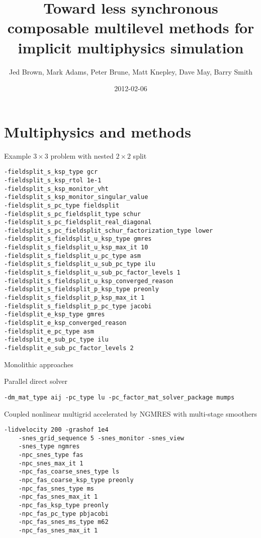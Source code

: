 \documentclass{beamer}
\title{Toward less synchronous composable multilevel methods for implicit multiphysics simulation}
\author{Jed Brown\inst{1}, Mark Adams\inst{2}, Peter Brune\inst{1}, Matt Knepley\inst{3}, Dave May\inst{4}, Barry Smith\inst{1}}
\institute
{
  \inst{1}{Mathematics and Computer Science Division, Argonne National Laboratory} \\
  \inst{2}{Columbia University} \\
  \inst{3}{Computation Institute, University of Chicago} \\
  \inst{4}{ETH Z\"urich}
}
\date{2012-02-06}
\begin{document}
\lstset{language=C}
\normalem

\begin{frame}
  \titlepage
\end{frame}

\section{Multiphysics and methods}





\begin{frame}[fragile]{Example $3\times 3$ problem with nested $2\times 2$ split}
\begin{Verbatim}[formatcom=\footnotesize]
-fieldsplit_s_ksp_type gcr
-fieldsplit_s_ksp_rtol 1e-1
-fieldsplit_s_ksp_monitor_vht
-fieldsplit_s_ksp_monitor_singular_value
-fieldsplit_s_pc_type fieldsplit
-fieldsplit_s_pc_fieldsplit_type schur
-fieldsplit_s_pc_fieldsplit_real_diagonal
-fieldsplit_s_pc_fieldsplit_schur_factorization_type lower
-fieldsplit_s_fieldsplit_u_ksp_type gmres
-fieldsplit_s_fieldsplit_u_ksp_max_it 10
-fieldsplit_s_fieldsplit_u_pc_type asm
-fieldsplit_s_fieldsplit_u_sub_pc_type ilu
-fieldsplit_s_fieldsplit_u_sub_pc_factor_levels 1
-fieldsplit_s_fieldsplit_u_ksp_converged_reason
-fieldsplit_s_fieldsplit_p_ksp_type preonly
-fieldsplit_s_fieldsplit_p_ksp_max_it 1
-fieldsplit_s_fieldsplit_p_pc_type jacobi
-fieldsplit_e_ksp_type gmres
-fieldsplit_e_ksp_converged_reason
-fieldsplit_e_pc_type asm
-fieldsplit_e_sub_pc_type ilu
-fieldsplit_e_sub_pc_factor_levels 2
\end{Verbatim}
\end{frame}

\begin{frame}[fragile]{Monolithic approaches}
  \begin{block}{Parallel direct solver}
    \begin{Verbatim}[formatcom=\footnotesize]
      -dm_mat_type aij -pc_type lu -pc_factor_mat_solver_package mumps
    \end{Verbatim}
  \end{block}
  \begin{block}{Coupled nonlinear multigrid accelerated by NGMRES with multi-stage smoothers}
  \begin{Verbatim}[formatcom=\footnotesize]
    -lidvelocity 200 -grashof 1e4
    -snes_grid_sequence 5 -snes_monitor -snes_view
    -snes_type ngmres
    -npc_snes_type fas
    -npc_snes_max_it 1
    -npc_fas_coarse_snes_type ls
    -npc_fas_coarse_ksp_type preonly
    -npc_fas_snes_type ms
    -npc_fas_snes_max_it 1
    -npc_fas_ksp_type preonly
    -npc_fas_pc_type pbjacobi
    -npc_fas_snes_ms_type m62
    -npc_fas_snes_max_it 1
  \end{Verbatim}
\end{block}
\end{frame}
\end{document}
